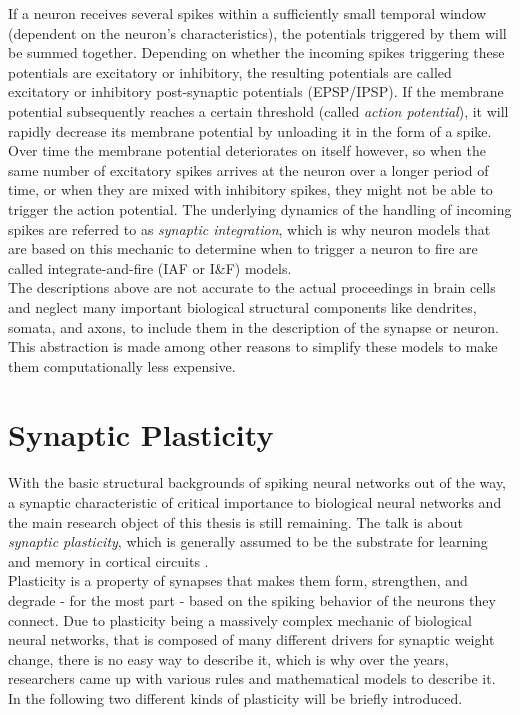 If a neuron receives several spikes within a sufficiently small temporal window (dependent on the neuron's characteristics), the potentials triggered by them will be summed together. Depending on whether the incoming spikes triggering these potentials are excitatory or inhibitory, the resulting potentials are called excitatory or inhibitory post-synaptic potentials (EPSP/IPSP). If the membrane potential subsequently reaches a certain threshold (called \textit{action potential}), it will rapidly decrease its membrane potential by unloading it in the form of a spike. Over time the membrane potential deteriorates on itself however, so when the same number of excitatory spikes arrives at the neuron over a longer period of time, or when they are mixed with inhibitory spikes, they might not be able to trigger the action potential. The underlying dynamics of the handling of incoming spikes are referred to as \textit{synaptic integration}, which is why neuron models that are based on this mechanic to determine when to trigger a neuron to fire are called integrate-and-fire (IAF or I\&F) models.\\
The descriptions above are not accurate to the actual proceedings in brain cells and neglect many important biological structural components like dendrites, somata, and axons, to include them in the description of the synapse or neuron. This abstraction is made among other reasons to simplify these models to make them computationally less expensive. 

\section{Synaptic Plasticity}
With the basic structural backgrounds of spiking neural networks out of the way, a synaptic characteristic of critical importance to biological neural networks and the main research object of this thesis is still remaining. The talk is about \textit{synaptic plasticity},  which is generally assumed to be the substrate for learning and memory in cortical circuits \parencite{morrison_diesmann_gerstner_2008}.\\
Plasticity is a property of synapses that makes them form, strengthen, and degrade - for the most part - based on the spiking behavior of the neurons they connect. Due to plasticity being a massively complex mechanic of biological neural networks, that is composed of many different drivers for synaptic weight change, there is no easy way to describe it, which is why over the years, researchers came up with various rules and mathematical models to describe it. In the following two different kinds of plasticity will be briefly introduced.

